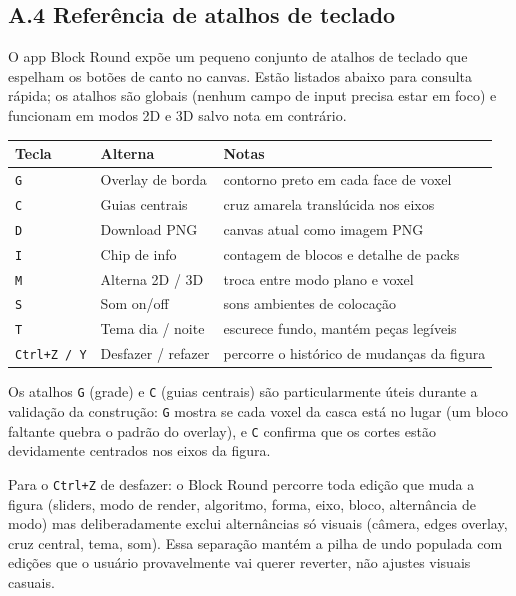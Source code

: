 \documentclass[12pt,a4paper]{scrartcl}
\newcommand{\code}[1]{\texttt{\small #1}}
\begin{document}
\subsection*{A.4 Referência de atalhos de teclado}

O app Block Round expõe um pequeno conjunto de atalhos de teclado que espelham os botões de canto no canvas. Estão listados abaixo para consulta rápida; os atalhos são globais (nenhum campo de input precisa estar em foco) e funcionam em modos 2D e 3D salvo nota em contrário.

\vspace{0.4em}
\begin{center}
\begin{tabular}{@{}lll@{}}
\toprule
\textbf{Tecla} & \textbf{Alterna} & \textbf{Notas} \\
\midrule
\code{G} & Overlay de borda  & contorno preto em cada face de voxel \\
\code{C} & Guias centrais  & cruz amarela translúcida nos eixos \\
\code{D} & Download PNG  & canvas atual como imagem PNG \\
\code{I} & Chip de info  & contagem de blocos e detalhe de packs \\
\code{M} & Alterna 2D / 3D  & troca entre modo plano e voxel \\
\code{S} & Som on/off  & sons ambientes de colocação \\
\code{T} & Tema dia / noite  & escurece fundo, mantém peças legíveis \\
\code{Ctrl+Z / Y} & Desfazer / refazer  & percorre o histórico de mudanças da figura \\
\bottomrule
\end{tabular}
\end{center}

Os atalhos \code{G} (grade) e \code{C} (guias centrais) são particularmente úteis durante a validação da construção: \code{G} mostra se cada voxel da casca está no lugar (um bloco faltante quebra o padrão do overlay), e \code{C} confirma que os cortes estão devidamente centrados nos eixos da figura.

Para o \code{Ctrl+Z} de desfazer: o Block Round percorre toda edição que muda a figura (sliders, modo de render, algoritmo, forma, eixo, bloco, alternância de modo) mas deliberadamente exclui alternâncias só visuais (câmera, edges overlay, cruz central, tema, som). Essa separação mantém a pilha de undo populada com edições que o usuário provavelmente vai querer reverter, não ajustes visuais casuais.
\end{document}
